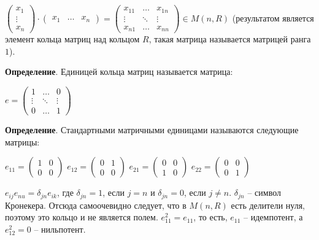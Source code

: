 \documentclass[a4paper]{book}
\begin{document}
$\begin{pmatrix}
x_1\\
\vdots \\
x_n
\end{pmatrix}
\cdot
\begin{pmatrix}
x_{1} & \dots & x_{n}
\end{pmatrix}
= 
 \begin{pmatrix}
x_{11} & \dots & x_{1n} \\
\vdots & \ddots & \vdots \\
x_{n1} & \dots & x_{nn}
\end{pmatrix} \in M(n,R)$ (результатом является элемент кольца матриц над кольцом $R$, такая матрица называется матрицей ранга $1$).

\textbf{Определение}. Единицей кольца матриц называется матрица:
 
$e=
\begin{pmatrix}
1 & \dots & 0 \\
\vdots & \ddots & \vdots \\
0 & \dots & 1

\end{pmatrix}$

\textbf{Определение}. Стандартными матричными единицами называются следующие матрицы: 

$e_{11}=
\begin{pmatrix}
	1 & 0\\
	0 & 0
\end{pmatrix}$
$e_{12}=
\begin{pmatrix}
0 & 1\\
0 & 0
\end{pmatrix}$
$e_{21}=
\begin{pmatrix}
0 & 0\\
1 & 0
\end{pmatrix}$
$e_{22}=
\begin{pmatrix}
0 & 0\\
0 & 1
\end{pmatrix}$


$e_{ij}e_{nu}=\delta_{jn}e_{ik}$, где $\delta_{jn} = 1$, если $j=n$ и $\delta_{jn} = 0$, если $j\neq n$. $\delta_{jn}$ -- символ Кронекера. Отсюда самоочевидно следует, что в $M(n,R)$ есть делители нуля, поэтому это кольцо и не является полем. $e_{11}^2 = e_{11}$, то есть, $e_{11}$ -- идемпотент, а $e_{12}^2 = 0$ -- нильпотент. 
\end{document}
